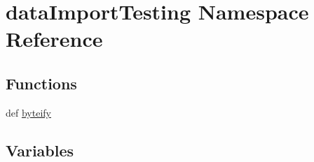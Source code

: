 \hypertarget{namespacedataImportTesting}{\section{data\-Import\-Testing Namespace Reference}
\label{namespacedataImportTesting}
}
\subsection*{Functions}
\begin{DoxyCompactItemize}
\item 
def \hyperlink{namespacedataImportTesting_acc6c76e1a83fb637f65b1cbab3356e4b}{byteify}
\end{DoxyCompactItemize}
\subsection*{Variables}
